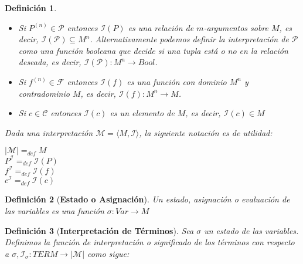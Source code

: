 \documentclass[letterpaper,11pt]{article}
\newtheorem{teo}{Definición}[]
\begin{document}
\begin{enumerate}
\begin{itemize}
\begin{teo}
                \begin{itemize}
                    \item Si $P^{(n)} \in \mathcal{P}$ entonces 
                    $\mathcal{I}(P)$ es una relación de $m$-argumentos sobre 
                    $M$, es decir, $\mathcal{I}(\mathcal{P}) \subseteq M^{n}$.
                    Alternativamente podemos definir la interpretación de 
                    $\mathcal{P}$ como una función booleana que decide si una 
                    tupla está o no en la relación deseada, es decir, 
                    $\mathcal{I}(\mathcal{P}): M^{n} \rightarrow Bool$.

                    \item Si $f^{(n)} \in \mathcal{F}$ entonces 
                    $\mathcal{I}(f)$ es una función con dominio 
                    $M^{n}$ y contradominio $M$, es decir, 
                    $\mathcal{I}(f): M^{n} \rightarrow M$.
                    \item Si $c \in \mathcal{C}$ entonces $\mathcal{I}(c)$
                    es un elemento de $M$, es decir, $\mathcal{I}(c) \in M$
                \end{itemize}
                
                Dada una interpretación $\mathcal{M} = \langle M, 
                \mathcal{I} \rangle$, la siguiente notación es de utilidad:
                
                \begin{center}
                    $|\mathcal{M}| =_{def} M$ \\
                    $P^{\mathcal{I}} =_{def} \mathcal{I}(P)$ \\
                    $f^{\mathcal{I}} =_{def} \mathcal{I}(f)$ \\
                    $c^{\mathcal{I}} =_{def} \mathcal{I}(c)$
                \end{center}
            \end{teo}

            \newpage
            \begin{teo}[\textbf{Estado o Asignación}]
                Un estado, asignación o evaluación de las variables es una
                función $\sigma: Var \rightarrow M$
            \end{teo}

            \begin{teo}[\textbf{Interpretación de Términos}]
                Sea $\sigma$ un estado de las variables. Definimos la función
                de interpretación o significado de los términos con respecto a
                $\sigma, \mathcal{I_{\sigma}}: TERM \rightarrow |\mathcal{M}|$
                como sigue:
                

\end{teo}
\end{itemize}
\end{enumerate}
\end{document}
